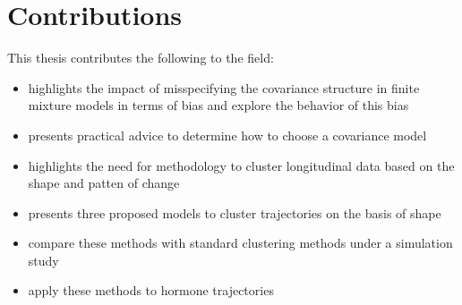 \documentclass[12pt]{article}
\begin{document}
\section{Contributions}
This thesis contributes the following to the field:
\begin{itemize}
\item highlights the impact of misspecifying the covariance structure in finite mixture models in terms of bias and explore the behavior of this bias
\item presents practical advice to determine how to choose a covariance model
\item highlights the need for methodology to cluster longitudinal data based on the shape and patten of change
\item presents three proposed models to cluster trajectories on the basis of shape
\item compare these methods with standard clustering methods under a simulation study
\item apply these methods to hormone trajectories
\end{itemize}
\end{document}
